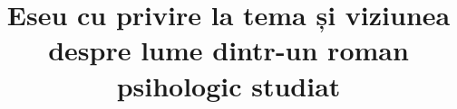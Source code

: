 

\title{Eseu cu privire la tema și viziunea despre lume dintr-un roman psihologic studiat}


 \maketitle %
 

